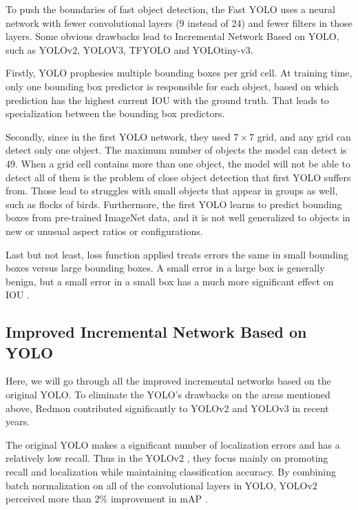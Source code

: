 
To push the boundaries of fast object detection, the  Fast YOLO \cite{yolov1} uses a neural network with fewer convolutional layers (9 instead of 24) and fewer filters in those layers. Some obvious drawbacks lead to Incremental Network Based on YOLO, such as YOLOv2\cite{yolov2}, YOLOV3\cite{33}, TFYOLO and YOLOtiny-v3\cite{18}.

Firstly, YOLO prophesies multiple bounding boxes per grid cell. At training time, only one bounding box predictor is responsible for each object, based on which prediction has the highest current IOU with the ground truth. That leads to specialization between the bounding box predictors.

Secondly, since in the first YOLO network, they used $7\times7$ grid, and any grid can detect only one object. The maximum number of objects the model can detect is 49. When a grid cell contains more than one object, the model will not be able to detect all of them is the problem of close object detection that first YOLO suffers from. Those lead to struggles with small objects that appear in groups as well, such as flocks of birds\cite{yolov1}. Furthermore, the first YOLO  learns to predict bounding boxes from pre-trained ImageNet data, and it is not well generalized to objects in new or unusual aspect ratios or configurations\cite{18}. 

Last but not least, loss function applied treats errors the same in small bounding boxes versus large bounding boxes\cite{yolov1}. A small error in a large box is generally benign, but a small error in a small box has a much more significant effect on IOU \cite{yolov1}.



\subsection{ Improved Incremental Network Based on YOLO }


Here, we will go through all the improved incremental networks based on the original YOLO. To eliminate the YOLO's drawbacks on the areas mentioned above, Redmon contributed significantly to YOLOv2 \cite{ yolov2} and YOLOv3 \cite{33} in recent years. 

The original YOLO makes a signiﬁcant number of localization errors and has a relatively low recall. Thus in the YOLOv2 \cite{ yolov2}, they focus mainly on promoting recall and localization while maintaining classiﬁcation accuracy. By combining batch normalization on all of the convolutional layers in YOLO,  YOLOv2 perceived more than 2\% improvement in mAP \cite{ yolov2}.

